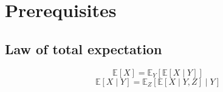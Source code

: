 \section{Prerequisites}

\subsection{Law of total expectation}

\begin{equation}
      \mathbb{E}[X] = \mathbb{E}_Y[\mathbb{E}[X \mid Y]]
\end{equation}
\begin{equation}
      \mathbb{E}[X \mid Y] = \mathbb{E}_Z[\mathbb{E}[X \mid Y, Z] \mid Y]
\end{equation}
